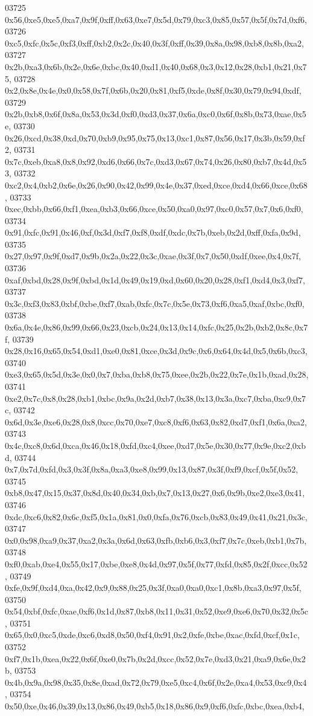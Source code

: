 \begin{DoxyCode}
03725   0x56,0xe5,0xe5,0xa7,0x9f,0xff,0x63,0xe7,0x5d,0x79,0xc3,0x85,0x57,0x5f,0x7d,0xf6,
03726   0xc5,0xfc,0x5c,0xf3,0xff,0xb2,0x2c,0x40,0x3f,0xff,0x39,0x8a,0x98,0xb8,0x8b,0xa2,
03727   0x2b,0xa3,0x6b,0x2e,0x6e,0xbc,0x40,0xd1,0x40,0x68,0x3,0x12,0x28,0xb1,0x21,0x75,
03728   0x2,0x8e,0x4e,0x0,0x58,0x7f,0x6b,0x20,0x81,0xf5,0xde,0x8f,0x30,0x79,0x94,0xdf,
03729   0x2b,0xb8,0x6f,0x8a,0x53,0x3d,0xf0,0xd3,0x37,0x6a,0xc0,0x6f,0x8b,0x73,0xae,0x5e,
03730   0x26,0xcd,0x38,0xd,0x70,0xb9,0x95,0x75,0x13,0xc1,0x87,0x56,0x17,0x3b,0x59,0xf2,
03731   0x7c,0xeb,0xa8,0x8,0x92,0xd6,0x66,0x7c,0xd3,0x67,0x74,0x26,0x80,0xb7,0x4d,0x53,
03732   0xc2,0x4,0xb2,0x6e,0x26,0x90,0x42,0x99,0x4e,0x37,0xed,0xce,0xd4,0x66,0xce,0x68,
03733   0xec,0xbb,0x66,0xf1,0xea,0xb3,0x66,0xce,0x50,0xa0,0x97,0xc0,0x57,0x7,0x6,0xf0,
03734   0x91,0xfc,0x91,0x46,0xf,0x3d,0xf7,0xf8,0xdf,0xdc,0x7b,0xeb,0x2d,0xff,0xfa,0x9d,
03735   0x27,0x97,0x9f,0xd7,0x9b,0x2a,0x22,0x3c,0xae,0x3f,0x7,0x50,0xdf,0xee,0x4,0x7f,
03736   0xaf,0xbd,0x28,0x9f,0xbd,0x1d,0x49,0x19,0xd,0x60,0x20,0x28,0xf1,0xd4,0x3,0xf7,
03737   0x3c,0xf3,0x83,0xbf,0xbe,0xf7,0xab,0xfc,0x7c,0x5e,0x73,0xf6,0xa5,0xaf,0xbc,0xf0,
03738   0x6a,0x4e,0x86,0x99,0x66,0x23,0xcb,0x24,0x13,0x14,0xfc,0x25,0x2b,0xb2,0x8c,0x7f,
03739   0x28,0x16,0x65,0x54,0xd1,0xe0,0x81,0xce,0x3d,0x9c,0x6,0x64,0x4d,0x5,0x6b,0xc3,
03740   0xe3,0x65,0x5d,0x3e,0x0,0x7,0xba,0xb8,0x75,0xee,0x2b,0x22,0x7e,0x1b,0xad,0x28,
03741   0xe2,0x7c,0x8,0x28,0xb1,0xbc,0x9a,0x2d,0xb7,0x38,0x13,0x3a,0xc7,0xba,0xc9,0x7c,
03742   0x6d,0x3e,0xe6,0x28,0x8,0xcc,0x70,0xe7,0xc8,0xf6,0x63,0x82,0xd7,0xf1,0x6a,0xa2,
03743   0x4c,0xc8,0x6d,0xca,0x46,0x18,0xfd,0xc4,0xee,0xd7,0x5e,0x30,0x77,0x9e,0xc2,0xbd,
03744   0x7,0x7d,0xfd,0x3,0x3f,0x8a,0xa3,0xe8,0x99,0x13,0x87,0x3f,0xf9,0xcf,0x5f,0x52,
03745   0xb8,0x47,0x15,0x37,0x8d,0x40,0x34,0xb,0x7,0x13,0x27,0x6,0x9b,0xe2,0xe3,0x41,
03746   0xdc,0xc6,0x82,0x6c,0xf5,0x1a,0x81,0x0,0xfa,0x76,0xcb,0x83,0x49,0x41,0x21,0x3c,
03747   0x0,0x98,0xa9,0x37,0xa2,0x3a,0x6d,0x63,0xfb,0xb6,0x3,0xf7,0x7c,0xeb,0xb1,0x7b,
03748   0xf0,0xab,0xe4,0x55,0x17,0xbe,0xe8,0x4d,0x97,0x5f,0x77,0xfd,0x85,0x2f,0xcc,0x52,
03749   0xfe,0x9f,0xd4,0xa,0x42,0x9,0x88,0x25,0x3f,0xa0,0xa0,0xc1,0x8b,0xa3,0x97,0x5f,
03750   0x54,0xbf,0xfc,0xae,0xf6,0x1d,0x87,0xb8,0x11,0x31,0x52,0xe9,0xe6,0x70,0x32,0x5c,
03751   0x65,0x0,0xc5,0xde,0xc6,0xd8,0x50,0xf4,0x91,0x2,0xfe,0xbe,0xac,0xfd,0xcf,0x1c,
03752   0xf7,0x1b,0xea,0x22,0x6f,0xe0,0x7b,0x2d,0xcc,0x52,0x7e,0xd3,0x21,0xa9,0x6e,0x2b,
03753   0x4b,0x9a,0x98,0x35,0x8e,0xad,0x72,0x79,0xe5,0xc4,0x6f,0x2e,0xa4,0x53,0xc9,0x4,
03754   0x50,0xe,0x46,0x39,0x13,0x86,0x49,0xb5,0x18,0x86,0x9,0xf6,0xfc,0xbc,0xea,0xb4,

\end{DoxyCode}
